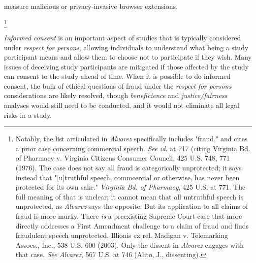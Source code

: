 \cite{pantelaiosFV8ForcedExecution,huangDonapiMaliciousNPM,xieArcanumDetectingEvaluating} measure malicious or privacy-invasive browser extensions.










\footnote{Notably, the list articulated in \textit{Alvarez} specifically includes "fraud," and cites a prior case concerning commercial speech. \textit{See id.} at 717 (citing Virginia Bd. of Pharmacy v. Virginia Citizens Consumer Council, 425 U.S. 748, 771 (1976). The case does not say all fraud is categorically unprotected; it says instead that "[u]truthful speech, commcercial or otherwise, has never been protected for its own sake." \textit{Virginia Bd. of Pharmacy}, 425 U.S. at 771. The full meaning of that is unclear; it cannot mean that all untruthful speech is unprotected, as \textit{Alvarez} says the opposite. But its application to all claims of fraud is more murky. There \textit{is} a preexisting Supreme Court case that more directly addresses a First Amendment challenge to a claim of fraud and finds fraudulent speech unprotected, Illionis ex rel. Madigan v. Telemarking Assocs., Inc., 538 U.S. 600 (2003). Only the dissent in \textit{Alvarez} engages with that case. \textit{See Alvarez}, 567 U.S. at 746 (Alito, J., dissenting).} 


\emph{Informed consent} is an important aspect of studies that is typically considered under \emph{respect for persons}, allowing individuals to understand what being a study participant means and allow them to choose not to participate if they wish.
Many issues of deceiving study participants are mitigated if those affected by the study can consent to the study ahead of time.
When it is possible to do informed consent, the bulk of ethical questions of fraud under the \emph{respect for persons} considerations  are likely resolved, though \emph{beneficience} and \emph{justice/fairness} analyses would still need to be conducted, and it would not eliminate all legal risks in a study.

